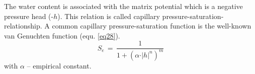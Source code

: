 The water content is associated with the matrix potential which is a negative pressure head (-$h$). This relation is called capillary pressure-saturation-relationship. A common capillary pressure-saturation function is the well-known van Genuchten function (equ. \ref{eq28}).
\begin{equation}
S_e\,=\,
\frac{1}{1+\left(\alpha\cdot\vert h \vert^n\right)^m}
\label{eq28}
\end{equation}
{\small
with $\alpha$ -- empirical constant.
}
